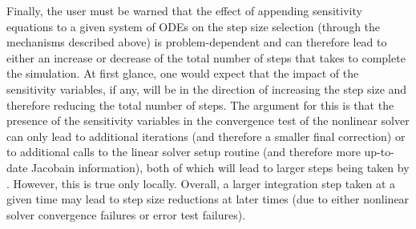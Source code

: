 Finally, the user must be warned that the effect of appending sensitivity 
equations to a given system of ODEs on the step size selection 
(through the mechanisms described above) is problem-dependent and can therefore
lead to either an increase or decrease of the total number of steps that {\cvodes} takes
to complete the simulation. At first glance, one would expect that the impact
of the sensitivity variables, if any, will be in the direction of increasing the
step size and therefore reducing the total number of steps. The argument for this
is that the presence of the sensitivity variables in the convergence test of the
nonlinear solver can only lead to additional iterations (and therefore a smaller
final correction) or to additional calls to the linear solver setup routine
(and therefore more up-to-date Jacobain information), both of which will lead
to larger steps being taken by {\cvodes}. However, this is true only locally.
Overall, a larger integration step taken at a given time may lead to 
step size reductions at later times (due to either nonlinear solver convergence
failures or error test failures).